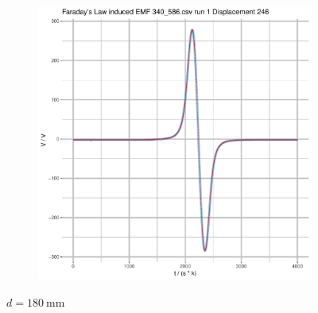 \documentclass[a4paper,11pt]{article}
\begin{document}
\begin{figure}[b]
\begin{subfigure}{.5\textwidth}
\end{subfigure}
\begin{subfigure}{.7\textwidth}
    \centering
    \includegraphics[width=\textwidth,page=15]{Rplots.pdf}
\end{subfigure}
\caption{\(d = \SI{180}{\milli\metre}\)}
\end{figure}
\end{document}
